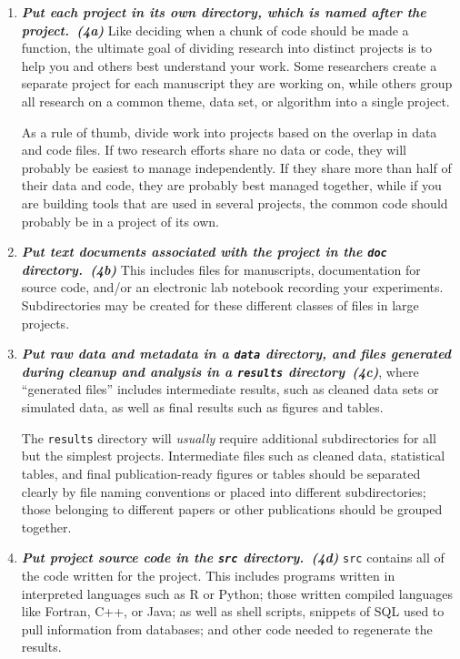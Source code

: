 \documentclass[10pt,letterpaper]{article}
\newcommand{\practice}[2]{\textbf{\emph{{#2}~({#1})}}}
\begin{document}
\begin{enumerate}

\item
  \practice{4a}{Put each project in its own directory, which is named
    after the project.}  Like deciding when a chunk of code should be
  made a function, the ultimate goal of dividing research into
  distinct projects is to help you and others best understand your
  work. Some researchers create a separate project for each manuscript
  they are working on, while others group all research on a common
  theme, data set, or algorithm into a single project.

  As a rule of thumb, divide work into projects based on the overlap
  in data and code files. If two research efforts share no data or
  code, they will probably be easiest to manage independently. If they
  share more than half of their data and code, they are probably best
  managed together, while if you are building tools that are used in
  several projects, the common code should probably be in a project of
  its own.

\item
  \practice{4b}{Put text documents associated with the project in the
    \texttt{doc} directory.} This includes files for manuscripts,
  documentation for source code, and/or an electronic lab notebook
  recording your experiments.  Subdirectories may be created for these
  different classes of files in large projects.

\item
  \practice{4c}{Put raw data and metadata in a \texttt{data} directory,
    and files generated during cleanup and analysis in a
    \texttt{results} directory}, where ``generated files'' includes
  intermediate results, such as cleaned data sets or simulated data,
  as well as final results such as figures and tables.

  The \texttt{results} directory will \emph{usually}
  require additional subdirectories for all but the simplest
  projects. Intermediate files such as cleaned data, statistical
  tables, and final publication-ready figures or tables should be
  separated clearly by file naming conventions or placed into
  different subdirectories; those belonging to different papers or
  other publications should be grouped together.

\item
  \practice{4d}{Put project source code in the \texttt{src} directory.}
  \texttt{src} contains all of the code written for the project. This includes
  programs written in interpreted languages
  such as R or Python; those written compiled languages like
  Fortran, C++, or Java; as well as shell scripts, snippets of SQL used to pull
  information from databases; and other code needed to regenerate
  the results.


\end{enumerate}
\end{document}
